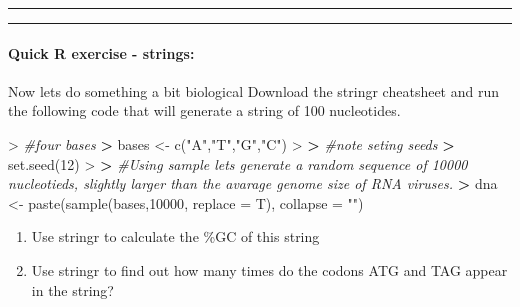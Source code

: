 \documentclass[
]{book}
\newenvironment{Shaded}{\begin{snugshade}}{\end{snugshade}}
\newcommand{\AttributeTok}[1]{\textcolor[rgb]{0.77,0.63,0.00}{#1}}
\newcommand{\CommentTok}[1]{\textcolor[rgb]{0.56,0.35,0.01}{\textit{#1}}}
\newcommand{\DecValTok}[1]{\textcolor[rgb]{0.00,0.00,0.81}{#1}}
\newcommand{\ErrorTok}[1]{\textcolor[rgb]{0.64,0.00,0.00}{\textbf{#1}}}
\newcommand{\FunctionTok}[1]{\textcolor[rgb]{0.00,0.00,0.00}{#1}}
\newcommand{\NormalTok}[1]{#1}
\newcommand{\OtherTok}[1]{\textcolor[rgb]{0.56,0.35,0.01}{#1}}
\newcommand{\SpecialCharTok}[1]{\textcolor[rgb]{0.00,0.00,0.00}{#1}}
\newcommand{\StringTok}[1]{\textcolor[rgb]{0.31,0.60,0.02}{#1}}
\providecommand{\tightlist}{%
  \setlength{\itemsep}{0pt}\setlength{\parskip}{0pt}}
\theoremstyle{definition}
\theoremstyle{definition}
\theoremstyle{definition}
\theoremstyle{definition}
\theoremstyle{remark}
\begin{document}
\begin{center}\rule{0.5\linewidth}{0.5pt}\end{center}

\begin{center}\rule{0.5\linewidth}{0.5pt}\end{center}

\hypertarget{quick-r-exercise---strings}{%
\paragraph*{\texorpdfstring{\textbf{Quick R exercise - strings:}}{Quick R exercise - strings:}}\label{quick-r-exercise---strings}}

Now lets do something a bit biological
Download the stringr cheatsheet and run the following code that will generate a string of 100 nucleotides.

\begin{Shaded}
\begin{Highlighting}[]
\SpecialCharTok{\textgreater{}} \CommentTok{\#four bases}
\ErrorTok{\textgreater{}}\NormalTok{ bases }\OtherTok{\textless{}{-}} \FunctionTok{c}\NormalTok{(}\StringTok{"A"}\NormalTok{,}\StringTok{"T"}\NormalTok{,}\StringTok{"G"}\NormalTok{,}\StringTok{"C"}\NormalTok{)}
\SpecialCharTok{\textgreater{}} 
\ErrorTok{\textgreater{}} \CommentTok{\#note seting seeds}
\ErrorTok{\textgreater{}} \FunctionTok{set.seed}\NormalTok{(}\DecValTok{12}\NormalTok{)}
\SpecialCharTok{\textgreater{}} 
\ErrorTok{\textgreater{}} \CommentTok{\#Using sample let\textquotesingle{}s generate a random sequence of 10000 nucleotieds, slightly larger than the avarage genome size of RNA viruses.}
\ErrorTok{\textgreater{}}\NormalTok{ dna }\OtherTok{\textless{}{-}} \FunctionTok{paste}\NormalTok{(}\FunctionTok{sample}\NormalTok{(bases,}\DecValTok{10000}\NormalTok{, }\AttributeTok{replace =}\NormalTok{ T), }\AttributeTok{collapse =} \StringTok{""}\NormalTok{)}
\end{Highlighting}
\end{Shaded}

\begin{enumerate}
\def\labelenumi{\arabic{enumi}.}
\tightlist
\item
  Use stringr to calculate the \%GC of this string
\item
  Use stringr to find out how many times do the codons ATG and TAG appear in the string?
\end{enumerate}
\end{document}
